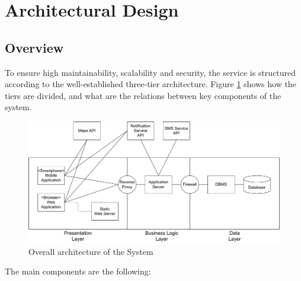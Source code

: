 
\section{Architectural Design}

\subsection{Overview}
To ensure high maintainability, scalability and security, the service is structured according to the well-established three-tier architecture.
Figure \ref{fig:overview-architecture} shows how the tiers are divided, and what are the relations between key components of the system.

\begin{figure}[H]
    \includegraphics[width=\linewidth]{images/draw.io/overview_architecture.pdf}
    \caption{Overall architecture of the System}
    \label{fig:overview-architecture}
\end{figure}

The main components are the following:

